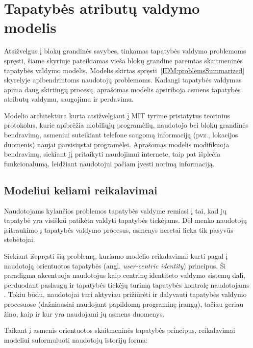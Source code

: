 \section{Tapatybės atributų valdymo modelis} \label{section:BCIDM}

Atsižvelgus į blokų grandinės savybes, tinkamas tapatybės valdymo problemoms spręsti, šiame skyriuje pateikiamas
vieša blokų grandine paremtas skaitmeninės tapatybės valdymo modelis. Modelis skirtas spręsti\hypertarget{IDM:problemsSummarized}{~\ref{IDM:problemsSummarized}} skyrelyje
apibendrintoms naudotojų problemoms. Kadangi tapatybės valdymas apima
daug skirtingų procesų, aprašomas modelis apsiriboja asmens tapatybės atributų valdymu, saugojimu ir perdavimu.

Modelio architektūra kurta atsižvelgiant į MIT tyrime \cite{MITPaper} pristatytus teorinius protokolus, kurie apibrėžia
mobiliųjų programėlių, naudotojo bei blokų grandinės bendravimą, asmeniui suteikiant telefone saugomą
informaciją (pvz., lokacijos duomenis) naujai parsisiųstai programėlei. Aprašomas modelis modifikuoja bendravimą, siekiant 
jį pritaikyti naudojimui internete, taip pat išplečia funkcionalumą, leidžiant naudotojui pačiam įvesti norimą informaciją.

\subsection{Modeliui keliami reikalavimai} \label{BCIDM:requirements}

Naudotojams kylančios problemos tapatybės valdyme remiasi į tai, kad jų tapatybė yra
visiškai patikėta valdyti tapatybės tiekėjams. Dėl menko naudotojų įsitraukimo į tapatybės valdymo
procesus, asmenys neretai lieka tik pasyvūs stebėtojai.

Siekiant išspręsti šią problemą, kuriamo modelio reikalavimai kurti pagal į naudotoją orientuotos tapatybės
(angl. \textit{user-centric identity}) principus. Ši paradigma akcentuoja naudotojus kaip centrinę
identiteto valdymo sistemų dalį, perduodant paslaugų ir tapatybės tiekėjų turimą tapatybės kontrolę
naudotojams \cite{Cao2010}. Tokiu būdu, naudotojai turi aktyviau prižiūrėti ir dalyvauti tapatybės
valdymo procesuose (dažniausiai naudojant papildomą programinę įrangą),
tačiau geriau žino, kaip ir kur yra naudojami jų asmens duomenys.

Taikant į asmenis orientuotos skaitmeninės tapatybės principus, reikalavimai modeliui suformuluoti naudotojų istorijų forma:

